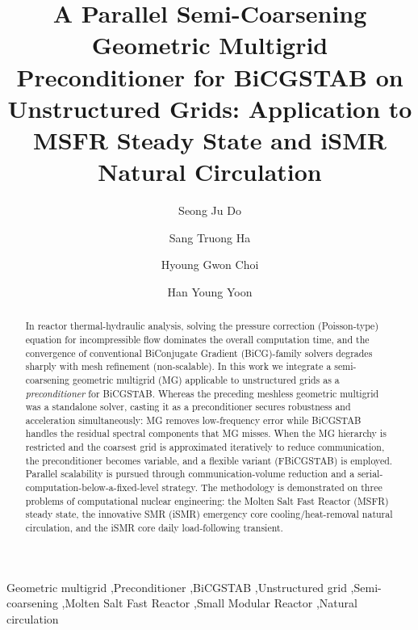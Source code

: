 \documentclass[review]{elsarticle}
\begin{document}
\begin{frontmatter}

  \title{A Parallel Semi-Coarsening Geometric Multigrid Preconditioner for BiCGSTAB on Unstructured Grids: Application to MSFR Steady State and iSMR Natural Circulation}

  \author[kaeri]{Seong Ju Do}

  \author[seoultech]{Sang Truong Ha}

  \author[seoultech]{Hyoung Gwon Choi}

  \author[kaeri]{Han Young Yoon}

  \address[kaeri]{Korea Atomic Energy Research Institute, 989-111 Daedeok-daero, Yuseong-gu, Daejeon, 34057, Republic of Korea}
  \address[seoultech]{Department of Mechanical and Automotive Engineering, Seoul National University of Science and Technology, Seoul, Republic of Korea}

  \begin{abstract}
    In reactor thermal-hydraulic analysis, solving the pressure correction (Poisson-type) equation for incompressible flow dominates the overall computation time, and the convergence of conventional BiConjugate Gradient (BiCG)-family solvers degrades sharply with mesh refinement (non-scalable). In this work we integrate a semi-coarsening geometric multigrid (MG) applicable to unstructured grids as a \emph{preconditioner} for BiCGSTAB. Whereas the preceding meshless geometric multigrid was a standalone solver, casting it as a preconditioner secures robustness and acceleration simultaneously: MG removes low-frequency error while BiCGSTAB handles the residual spectral components that MG misses. When the MG hierarchy is restricted and the coarsest grid is approximated iteratively to reduce communication, the preconditioner becomes variable, and a flexible variant (FBiCGSTAB) is employed. Parallel scalability is pursued through communication-volume reduction and a serial-computation-below-a-fixed-level strategy. The methodology is demonstrated on three problems of computational nuclear engineering: the Molten Salt Fast Reactor (MSFR) steady state, the innovative SMR (iSMR) emergency core cooling/heat-removal natural circulation, and the iSMR core daily load-following transient.
  \end{abstract}

  \begin{keyword}
    Geometric multigrid \sep Preconditioner \sep BiCGSTAB \sep Unstructured grid \sep Semi-coarsening \sep Molten Salt Fast Reactor \sep Small Modular Reactor \sep Natural circulation
  \end{keyword}
\end{frontmatter}
\end{document}
